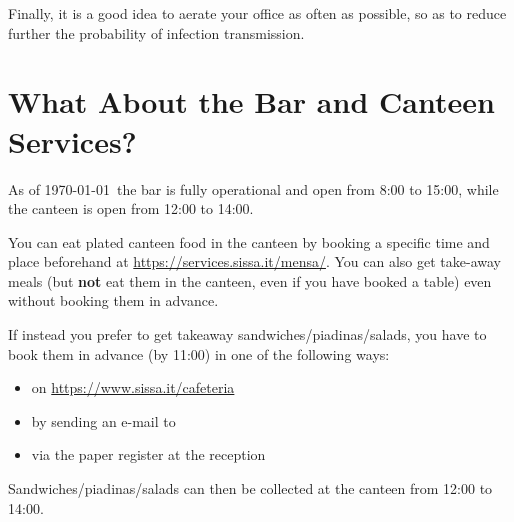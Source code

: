 \documentclass{sissavademecum}
\begin{document}
Finally, it is a good idea to aerate your office as often as possible, so as to reduce further the probability of infection transmission.


\section{What About the Bar and Canteen Services?}

As of \today\ the bar is fully operational and open from 8:00 to 15:00, while the canteen is open from 12:00 to 14:00.

You can eat plated canteen food in the canteen by booking a specific time and place beforehand at \url{https://services.sissa.it/mensa/}. You can also get take-away meals (but \textbf{not} eat them in the canteen, even if you have booked a table) even without booking them in advance.

If instead you prefer to get takeaway sandwiches/piadinas/salads, you have to book them in advance (by 11:00) in one of the following ways:
\begin{itemize}
\item on \url{https://www.sissa.it/cafeteria}
\item by sending an e-mail to 
\item via the paper register at the reception
\end{itemize}
Sandwiches/piadinas/salads can then be collected at the canteen from 12:00 to 14:00.
\end{document}
